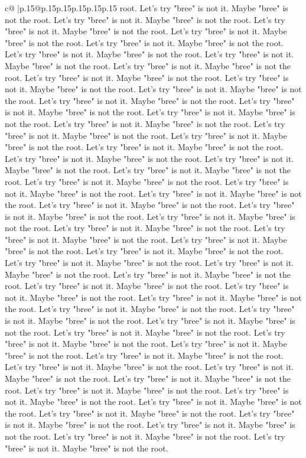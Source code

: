 \documentclass{article}
\begin{document}
{\begin{supertabular}{c@{$\;$}|p{.15\linewidth}@{}p{.15\linewidth}p{.15\linewidth}p{.15\linewidth}p{.15\linewidth}p{.15\linewidth}}
{{{root. Let's try "bree" is not it. Maybe "bree" is not the root. Let's try "bree" is not it. Maybe "bree" is not the root. Let's try "bree" is not it. Maybe "bree" is not the root. Let's try "bree" is not it. Maybe "bree" is not the root. Let's try "bree" is not it. Maybe "bree" is not the root. Let's try "bree" is not it. Maybe "bree" is not the root. Let's try "bree" is not it. Maybe "bree" is not the root. Let's try "bree" is not it. Maybe "bree" is not the root. Let's try "bree" is not it. Maybe "bree" is not the root. Let's try "bree" is not it. Maybe "bree" is not the root. Let's try "bree" is not it. Maybe "bree" is not the root. Let's try "bree" is not it. Maybe "bree" is not the root. Let's try "bree" is not it. Maybe "bree" is not the root. Let's try "bree" is not it. Maybe "bree" is not the root. Let's try "bree" is not it. Maybe "bree" is not the root. Let's try "bree" is not it. Maybe "bree" is not the root. Let's try "bree" is not it. Maybe "bree" is not the root. Let's try "bree" is not it. Maybe "bree" is not the root. Let's try "bree" is not it. Maybe "bree" is not the root. Let's try "bree" is not it. Maybe "bree" is not the root. Let's try "bree" is not it. Maybe "bree" is not the root. Let's try "bree" is not it. Maybe "bree" is not the root. Let's try "bree" is not it. Maybe "bree" is not the root. Let's try "bree" is not it. Maybe "bree" is not the root. Let's try "bree" is not it. Maybe "bree" is not the root. Let's try "bree" is not it. Maybe "bree" is not the root. Let's try "bree" is not it. Maybe "bree" is not the root. Let's try "bree" is not it. Maybe "bree" is not the root. Let's try "bree" is not it. Maybe "bree" is not the root. Let's try "bree" is not it. Maybe "bree" is not the root. Let's try "bree" is not it. Maybe "bree" is not the root. Let's try "bree" is not it. Maybe "bree" is not the root. Let's try "bree" is not it. Maybe "bree" is not the root. Let's try "bree" is not it. Maybe "bree" is not the root. Let's try "bree" is not it. Maybe "bree" is not the root. Let's try "bree" is not it. Maybe "bree" is not the root. Let's try "bree" is not it. Maybe "bree" is not the root. Let's try "bree" is not it. Maybe "bree" is not the root. Let's try "bree" is not it. Maybe "bree" is not the root. Let's try "bree" is not it. Maybe "bree" is not the root. Let's try "bree" is not it. Maybe "bree" is not the root. Let's try "bree" is not it. Maybe "bree" is not the root. Let's try "bree" is not it. Maybe "bree" is not the root. Let's try "bree" is not it. Maybe "bree" is not the root. Let's try "bree" is not it. Maybe "bree" is not the root. Let's try "bree" is not it. Maybe "bree" is not the root. Let's try "bree" is not it. Maybe "bree" is not the root. Let's try "bree" is not it. Maybe "bree" is not the root. Let's try "bree" is not it. Maybe "bree" is not the root. Let's try "bree" is not it. Maybe "bree" is not the root. Let's try "bree" is not it. Maybe "bree" is not the root. Let's try "bree" is not it. Maybe "bree" is not the root. Let's try "bree" is not it. Maybe "bree" is not the root. Let's try "bree" is not it. Maybe "bree" is not the root. Let's try "bree" is not it. Maybe "bree" is not the root. }}}
\end{supertabular}}
\end{document}
